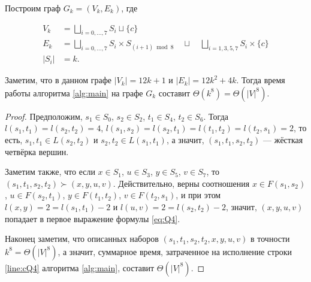 \begin{theorem}
Построим граф $G_k = (V_k, E_k)$, где 

\begin{align}
V_k &= \bigsqcup\limits_{i = 0,\ldots,7} S_i \sqcup \{c\} \\
E_k &= \bigsqcup\limits_{i = 0,\ldots,7} S_i \times S_{(i+1) \bmod 8} \quad\sqcup\quad \bigsqcup\limits_{i=1,3,5,7} S_i \times \{c\} \\
|S_i| &= k.
\end{align}

Заметим, что в данном графе $|V_k| = 12k + 1$ и $|E_k| = 12k^2 + 4k$. Тогда время работы алгоритма \ref{alg:main} на графе $G_k$ составит $\Theta(k^8) = \Theta(|V|^8)$.

\end{theorem}
\begin{proof}
Предположим, $s_1 \in S_0$, $s_2 \in S_2$, $t_1 \in S_4$, $t_2 \in S_6$. Тогда $l(s_1, t_1) = l(s_2, t_2) = 4$, $l(s_1, s_2) = l(s_2, t_1) = l(t_1, t_2) = l(t_2, s_1) = 2$, то есть, $s_1, t_1 \in L(s_2, t_2)$ и $s_2, t_2 \in L(s_1, t_1)$, а значит, $(s_1, t_1, s_2, t_2)$ --- жёсткая четвёрка вершин.

Заметим также, что если $x \in S_1$, $u \in S_3$, $y \in S_5$, $v \in S_7$, то $(s_1, t_1, s_2, t_2) \succ (x, y, u, v)$. Действительно, верны соотношения $x \in F(s_1, s_2)$, $u \in F(s_2, t_1)$, $y \in F(t_1, t_2)$, $v \in F(t_2, s_1)$, и при этом $l(x, y) = 2 = l(s_1, t_1) - 2$ и $l(u, v) = 2 = l(s_2, t_2) - 2$, значит, $(x, y, u, v)$ попадает в первое выражение формулы \ref{eq:Q4}.

Наконец заметим, что описанных наборов $(s_1, t_1, s_2, t_2, x, y, u, v)$ в точности $k^8 = \Theta(|V|^8)$, а значит, суммарное время, затраченное на исполнение строки \ref{line:cQ4} алгоритма \ref{alg:main}, составит $\Theta(|V|^8)$.
\end{proof}
